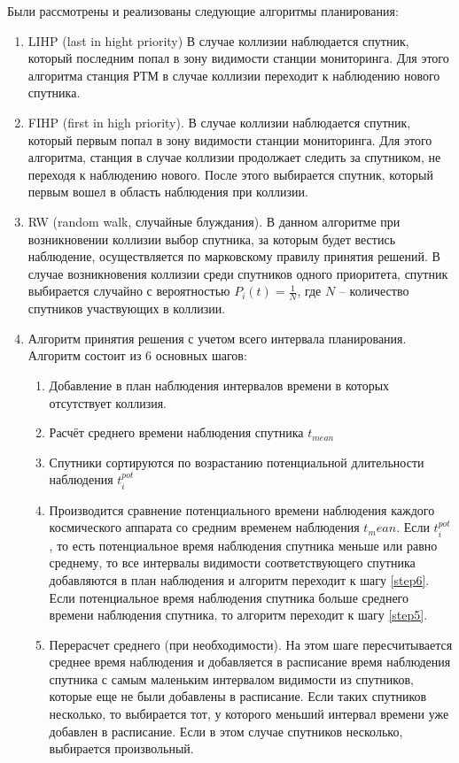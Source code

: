 Были рассмотрены и реализованы следующие алгоритмы планирования:

\begin{enumerate}
	\item LIHP (last in hight priority) В случае коллизии наблюдается спутник, который последним попал в зону видимости станции мониторинга. Для этого алгоритма станция РТМ в случае коллизии переходит к наблюдению нового спутника.
	\item FIHP (first in high priority). В случае коллизии наблюдается спутник, который первым попал в зону видимости станции мониторинга. Для этого алгоритма, станция в случае коллизии продолжает следить за спутником, не переходя к наблюдению нового. После этого выбирается спутник, который первым вошел в область наблюдения при коллизии.
	\item RW (random walk, случайные блуждания). В данном алгоритме при возникновении коллизии выбор спутника, за которым будет вестись наблюдение, осуществляется по марковскому правилу принятия решений. В случае возникновения коллизии среди спутников одного приоритета, спутник выбирается случайно с вероятностью $P_i(t) = \frac{1}{N}$, где $N$ – количество спутников участвующих в коллизии.
	\item Алгоритм принятия решения с учетом всего интервала планирования. Алгоритм состоит из 6 основных шагов:
	\begin{enumerate}
		\item Добавление в план наблюдения интервалов времени в которых отсутствует коллизия.\label{step1}
		\item Расчёт среднего времени наблюдения спутника $t_{mean}$ \label{step2}
		\item Спутники сортируются по возрастанию потенциальной длительности наблюдения $t_i^{pot}$ \label{step3}
		\item Производится сравнение потенциального времени наблюдения каждого космического аппарата со средним временем наблюдения $t_mean$. Если $t_i^{pot}$, то есть потенциальное время наблюдения спутника меньше или равно среднему, то все интервалы видимости соответствующего спутника добавляются в план наблюдения и алгоритм переходит к шагу \ref{step6}. Если потенциальное время наблюдения спутника больше среднего времени наблюдения спутника, то алгоритм переходит к шагу \ref{step5}. \label{step4}
		\item Перерасчет среднего (при необходимости). На этом шаге пересчитывается среднее время наблюдения и добавляется в расписание время наблюдения спутника с самым маленьким интервалом видимости из спутников, которые еще не были добавлены в расписание. Если таких спутников несколько, то выбирается тот, у которого меньший интервал времени уже добавлен в расписание. Если в этом случае спутников несколько, выбирается произвольный.\label{step5}

\end{enumerate}
\end{enumerate}
